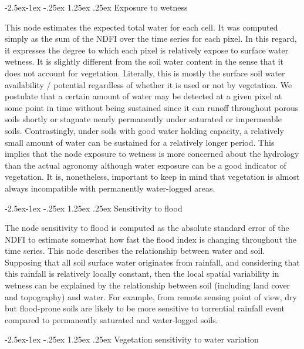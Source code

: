 \documentclass[12pt,oneside]{article}
\makeatletter
\renewcommand\paragraph{\@startsection{paragraph}{4}{\z@}%
            {-2.5ex\@plus -1ex \@minus -.25ex}%
            {1.25ex \@plus .25ex}%
            {\normalfont\normalsize\bfseries}}
\makeatother
\begin{document}
\hypertarget{I522}{%
\paragraph{Exposure to wetness}\label{I522}}

This node estimates the expected total water for each cell. It was computed simply as the sum of the NDFI over the time series for each pixel. In this regard, it expresses the degree to which each pixel is relatively expose to surface water wetness. It is slightly different from the soil water content in the sense that it does not account for vegetation. Literally, this is mostly the surface soil water availability / potential regardless of whether it is used or not by vegetation. We postulate that a certain amount of water may be detected at a given pixel at some point in time without being sustained since it can runoff throughout porous soils shortly or stagnate nearly permanently under saturated or impermeable soils. Contrastingly, under soils with good water holding capacity, a relatively small amount of water can be sustained for a relatively longer period. This implies that the node exposure to wetness is more concerned about the hydrology than the actual agronomy although water exposure can be a good indicator of vegetation. It is, nonetheless, important to keep in mind that vegetation is almost always incompatible with permanently water-logged areas.

\hypertarget{I523}{%
\paragraph{Sensitivity to flood}\label{I523}}

The node sensitivity to flood is computed as the absolute standard error of the NDFI to estimate somewhat how fast the flood index is changing throughout the time series. This node describes the relationship between water and soil. Supposing that all soil surface water originates from rainfall, and considering that this rainfall is relatively locally constant, then the local spatial variability in wetness can be explained by the relationship between soil (including land cover and topography) and water. For example, from remote sensing point of view, dry but flood-prone soils are likely to be more sensitive to torrential rainfall event compared to permanently saturated and water-logged soils.

\hypertarget{I524}{%
\paragraph{Vegetation sensitivity to water variation}\label{I524}}
\end{document}
